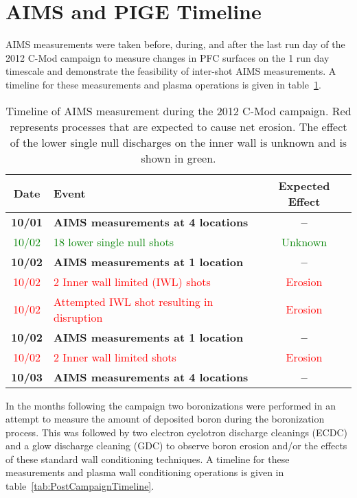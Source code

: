 \documentclass[final,3p,times,twocolumn]{elsarticle}
\begin{document}
\section{AIMS and PIGE Timeline}
\label{sec:AIMSPIGETimeline}
AIMS measurements were taken before, during, and after the last run day of the 2012 C-Mod campaign to measure changes in PFC surfaces on the 1 run day timescale and demonstrate the feasibility of inter-shot AIMS measurements.  A timeline for these measurements and plasma operations is given in table~\ref{tab:CampaignTimeline}.
%
\begin{table}
 \centering
 \begin{tabular}{|c|l|c|}
  \hline
  Date & Event & Expected Effect\\ \hline \hline
  \textbf{10/01} & \textbf{AIMS measurements at 4 locations} & \textbf{--}\\ \hline
  \textcolor{green}{10/02} & \textcolor{green}{18 lower single null shots} & \textcolor{green}{Unknown} \\ \hline
  \textbf{10/02} & \textbf{AIMS measurements at 1 location} & \textbf{--}\\ \hline
  \textcolor{red}{10/02} & \textcolor{red}{2 Inner wall limited (IWL) shots} & \textcolor{red}{Erosion} \\ \hline
  \textcolor{red}{10/02} & \textcolor{red}{Attempted IWL shot resulting in disruption} & \textcolor{red}{Erosion}\\ \hline
  \textbf{10/02} & \textbf{AIMS measurements at 1 location} & \textbf{--}\\ \hline
  \textcolor{red}{10/02} & \textcolor{red}{2 Inner wall limited shots} & \textcolor{red}{Erosion} \\ \hline
  \textbf{10/03} & \textbf{AIMS measurements at 4 locations} & \textbf{--}\\ \hline
 \end{tabular}
 \caption{Timeline of AIMS measurement during the 2012 C-Mod campaign.  Red represents processes that are expected to cause net erosion.  The effect of the lower single null discharges on the inner wall is unknown and is shown in green.}  
 \label{tab:CampaignTimeline}
\end{table}
%
In the months following the campaign two boronizations were performed in an attempt to measure the amount of deposited boron during the boronization process.  This was followed by two electron cyclotron discharge cleanings (ECDC) and a glow discharge cleaning (GDC) to observe boron erosion and/or the effects of these standard wall conditioning techniques.   A timeline for these measurements and plasma wall conditioning operations is given in table~\ref{tab:PostCampaignTimeline}. 
\end{document}
